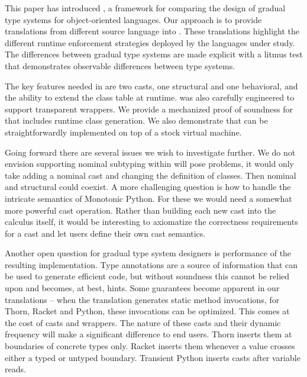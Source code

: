 \documentclass[acmsmall, anonymous, authordraft, review]{acmart} %
\begin{document}
This paper has introduced \kafka, a framework for comparing the design of
gradual type systems for object-oriented languages. Our approach is to
provide translations from different source language into \kafka. These
translations highlight the different runtime enforcement strategies deployed
by the languages under study. The differences between gradual type systems
are made explicit with a litmus test that demonstrates observable
differences between type systems.

The key features needed in \kafka are two casts, one structural and 
one behavioral, and the ability to extend the class table at runtime.
\kafka was also carefully engineered to support transparent wrappers.  We
provide a mechanized proof of soundness for \kafka that includes runtime
class generation.  We also demonstrate that \kafka can be straightforwardly
implemented on top of a stock virtual machine.

Going forward there are several issues we wish to investigate further.  We do
not envision supporting nominal subtyping within \kafka will pose
problems, it would only take adding a nominal cast and changing the
definition of classes. Then nominal and structural could coexist. A more
challenging question is how to handle the intricate semantics of Monotonic
Python. For these we would need a somewhat more powerful cast operation.
Rather than building each new cast into the calculus itself, it would be
interesting to axiomatize the correctness requirements for a cast and let
users define their own cast semantics. 

Another open question for gradual type system designers is performance of
the resulting implementation. Type annotations are a source of information
that can be used to generate efficient code, but without soundness this
cannot be relied upon and becomes, at best, hints.  Some guarantees become
apparent in our translations -- when the translation generates static method
invocations, for Thorn, Racket and Python, these invocations can be
optimized. This comes at the cost of casts and wrappers.  The nature of
these casts and their dynamic frequency will make a significant difference
to end users.  Thorn inserts them at boundaries of concrete types
only. Racket inserts them whenever a value crosses either a typed or untyped
boundary. Transient Python inserts casts after variable reads.





\appendix
\end{document}
